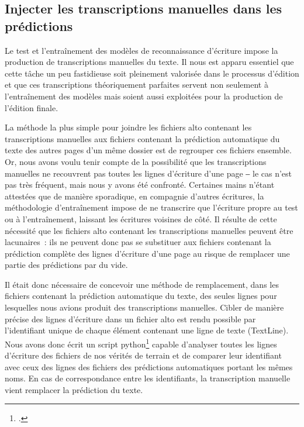 \documentclass[a4paper,12pt,twoside]{book}
\begin{document}
			\subsection{Injecter les transcriptions manuelles dans les \glspl{prédiction}}
				\label{injection}
				Le test et l'entraînement des modèles de reconnaissance d'écriture impose la production de transcriptions manuelles du texte. Il nous est apparu essentiel que cette tâche un peu fastidieuse soit pleinement valorisée dans le processus d'édition et que ces transcriptions théoriquement parfaites servent non seulement à l'entraînement des modèles mais soient aussi exploitées pour la production de l'édition finale.
				
				La méthode la plus simple pour joindre les fichiers \gls{alto} contenant les transcriptions manuelles aux fichiers contenant la \gls{prédiction} automatique du texte des autres pages d'un même dossier est de regrouper ces fichiers ensemble. Or, nous avons voulu tenir compte de la possibilité que les transcriptions manuelles ne recouvrent pas toutes les lignes d'écriture d'une page ‒ le cas n'est pas très fréquent, mais nous y avons été confronté. Certaines mains n'étant attestées que de manière sporadique, en compagnie d'autres écritures, la méthodologie d'entraînement impose de ne transcrire que l'écriture propre au test ou à l'entraînement, laissant les écritures voisines de côté. Il résulte de cette nécessité que les fichiers \gls{alto} contenant les transcriptions manuelles peuvent être lacunaires~: ils ne peuvent donc pas se substituer aux fichiers contenant la \gls{prédiction} complète des lignes d'écriture d'une page au risque de remplacer une partie des \glspl{prédiction} par du vide. 
				
				Il était donc nécessaire de concevoir une méthode de remplacement, dans les fichiers contenant la \gls{prédiction} automatique du texte, des seules lignes pour lesquelles nous avions produit des transcriptions manuelles. Cibler de manière précise des lignes d'écriture dans un fichier \gls{alto} est rendu possible par l'identifiant unique de chaque élément contenant une ligne de texte (\textsf{TextLine}). Nous avons donc écrit un script python\footcite{biayInjectTranscriptPy2022a} capable d'analyser toutes les lignes d'écriture des fichiers de nos vérités de terrain et de comparer leur identifiant avec ceux des lignes des fichiers des \glspl{prédiction} automatiques portant les mêmes noms. En cas de correspondance entre les identifiants, la transcription manuelle vient remplacer la \gls{prédiction} du texte.
			
\end{document}
